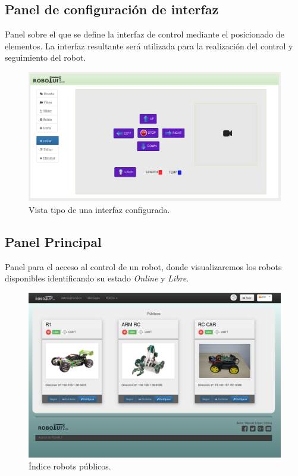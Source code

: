 \documentclass[a4paper,12pt]{article}
\begin{document}
\subsection { Panel de configuración de interfaz }

Panel sobre el que se define la interfaz de control mediante el posicionado de elementos. La interfaz resultante será utilizada para la realización del control y seguimiento del robot.\\

\begin{figure}[H]
  \begin{center}
    \includegraphics[scale=.3]{imagenes/interfaz-creada.png}
  \end{center}
  \caption{Vista tipo de una interfaz configurada.}
  \label{website:interfaz-configurada}
\end{figure}

\subsection { Panel Principal}

Panel para el acceso al control de un robot, donde visualizaremos los robots disponibles identificando su estado \emph{Online} y \emph{Libre}. 

\begin{figure}[H]
  \begin{center}
    \includegraphics[scale=.29]{imagenes/robots-publicos.png}
  \end{center}
  \caption{ Índice robots públicos.}
  \label{website:inice-public-robots}
\end{figure}
\end{document}
